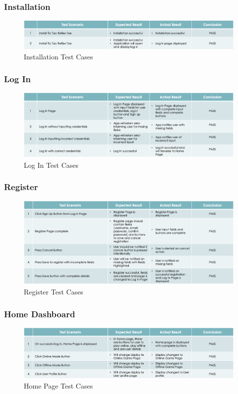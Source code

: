 \documentclass{article}
\begin{document}
    \subsubsection{Installation}
         \begin{figure}[h]
            \centering
            \includegraphics[width=5.5in]{images/test_1_install.png}
        \caption{Installation Test Cases}
        \end{figure}   
    \subsubsection{Log In}
        \begin{figure}[h]
            \centering
            \includegraphics[width=5.5in]{images/test_2_log.png}
        \caption{Log In Test Cases}
        \end{figure}
        \newpage
    \subsubsection{Register}
        \begin{figure}[h]
            \centering
            \includegraphics[width=5.5in]{images/test_3_register.png}
        \caption{Register Test Cases}
        \end{figure}
    \subsubsection{Home Dashboard}
        \begin{figure}[h]
            \centering
            \includegraphics[width=5.5in]{images/test_4_home.png}
        \caption{Home Page Test Cases}
        \end{figure}
        \newpage
\end{document}
